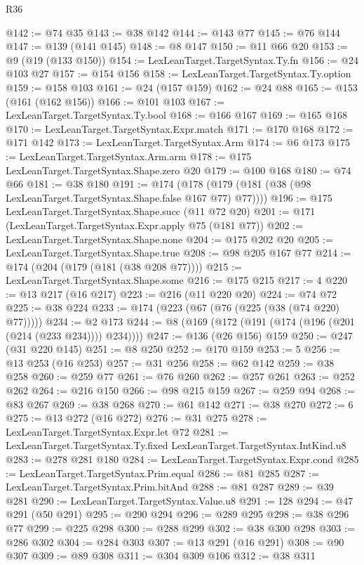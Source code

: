 \begin{lexlean}{R36}
\begin{coremodule}
@142 := @74 @35
@143 := @38 @142
@144 := @143 @77
@145 := @76 @144
@147 := @139 (@141 @145)
@148 := @8 @147
@150 := @11 @66 @20
@153 := @9 (@19 (@133 @150))
@154 := LexLeanTarget.TargetSyntax.Ty.fn
@156 := @24 @103 @27
@157 := @154 @156
@158 := LexLeanTarget.TargetSyntax.Ty.option
@159 := @158 @103
@161 := @24 (@157 @159)
@162 := @24 @88
@165 := @153 (@161 (@162 @156))
@166 := @101 @103
@167 := LexLeanTarget.TargetSyntax.Ty.bool
@168 := @166 @167
@169 := @165 @168
@170 := LexLeanTarget.TargetSyntax.Expr.match
@171 := @170 @168
@172 := @171 @142
@173 := LexLeanTarget.TargetSyntax.Arm
@174 := @6 @173
@175 := LexLeanTarget.TargetSyntax.Arm.arm
@178 := @175 LexLeanTarget.TargetSyntax.Shape.zero @20
@179 := @100 @168
@180 := @74 @66
@181 := @38 @180
@191 := @174 (@178 (@179 (@181 (@38 (@98 LexLeanTarget.TargetSyntax.Shape.false @167 @77) @77))))
@196 := @175 LexLeanTarget.TargetSyntax.Shape.succ (@11 @72 @20)
@201 := @171 (LexLeanTarget.TargetSyntax.Expr.apply @75 (@181 @77))
@202 := LexLeanTarget.TargetSyntax.Shape.none
@204 := @175 @202 @20
@205 := LexLeanTarget.TargetSyntax.Shape.true
@208 := @98 @205 @167 @77
@214 := @174 (@204 (@179 (@181 (@38 @208 @77))))
@215 := LexLeanTarget.TargetSyntax.Shape.some
@216 := @175 @215
@217 := 4
@220 := @13 @217 (@16 @217)
@223 := @216 (@11 @220 @20)
@224 := @74 @72
@225 := @38 @224
@233 := @174 (@223 (@67 (@76 (@225 (@38 (@74 @220) @77)))))
@234 := @2 @173
@244 := @8 (@169 (@172 (@191 (@174 (@196 (@201 (@214 (@233 @234)))) @234))))
@247 := @136 (@26 @156) @159
@250 := @247 (@31 @220 @145)
@251 := @8 @250
@252 := @170 @159
@253 := 5
@256 := @13 @253 (@16 @253)
@257 := @31 @256
@258 := @62 @142
@259 := @38 @258
@260 := @259 @77
@261 := @76 @260
@262 := @257 @261
@263 := @252 @262
@264 := @216 @150
@266 := @98 @215 @159
@267 := @259 @94
@268 := @83 @267
@269 := @38 @268
@270 := @61 @142
@271 := @38 @270
@272 := 6
@275 := @13 @272 (@16 @272)
@276 := @31 @275
@278 := LexLeanTarget.TargetSyntax.Expr.let @72
@281 := LexLeanTarget.TargetSyntax.Ty.fixed LexLeanTarget.TargetSyntax.IntKind.u8
@283 := @278 @281 @180
@284 := LexLeanTarget.TargetSyntax.Expr.cond
@285 := LexLeanTarget.TargetSyntax.Prim.equal
@286 := @81 @285
@287 := LexLeanTarget.TargetSyntax.Prim.bitAnd
@288 := @81 @287
@289 := @39 @281
@290 := LexLeanTarget.TargetSyntax.Value.u8
@291 := 128
@294 := @47 @291 (@50 @291)
@295 := @290 @294
@296 := @289 @295
@298 := @38 @296 @77
@299 := @225 @298
@300 := @288 @299
@302 := @38 @300 @298
@303 := @286 @302
@304 := @284 @303
@307 := @13 @291 (@16 @291)
@308 := @90 @307
@309 := @89 @308
@311 := @304 @309 @106
@312 := @38 @311

\end{coremodule}
\end{lexlean}
